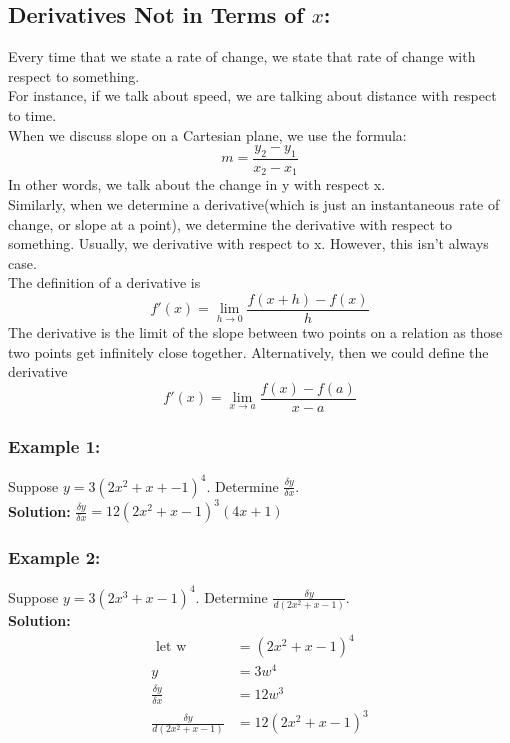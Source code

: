 \documentclass{article}
\begin{document}
\subsection{Derivatives Not in Terms of $x$:}
Every time that we state a rate of change, we state that rate of change with respect to something.\\
For instance, if we talk about speed, we are talking about distance with respect to time.\\
When we discuss slope on a Cartesian plane, we use the formula:
$$m=\frac{y_2-y_1}{x_2-x_1}$$
In other words, we talk about the change in y with respect x.\\
Similarly, when we determine a derivative(which is just an instantaneous rate of change, or slope at a point), we determine the derivative with respect to something. Usually, we derivative with respect to x. However, this isn't always case.\\

The definition of a derivative is 
$$f'(x)=\lim_{h \to 0}\frac{f(x+h)-f(x)}{h}$$
The derivative is the limit of the slope between two points on a relation as those two points get infinitely close together. Alternatively, then we could define the derivative $$f'(x)= \lim_{x \to a }\frac{f(x)-f(a)}{x-a}$$

\subsubsection*{Example 1:}
Suppose $y=3(2x^2+x+-1)^4$. Determine $\frac{\delta y}{\delta x}$.\\
\textbf{Solution:}
$\frac{\delta y}{\delta x}=12(2x^2+x-1)^3(4x+1)$
\subsubsection*{Example 2:}
Suppose $y=3(2x^3+x-1)^4$. Determine $\frac{\delta y}{d(2x^2+x-1)}$.\\
\textbf{Solution:}
\begin{align*}
    \text{ let w } &= (2x^2+x-1)^4\\
    y&=3w^4\\
    \frac{\delta y}{\delta x}&=12w^3\\
    \frac{\delta y}{d(2x^2+x-1)}&=12(2x^2+x-1)^3
\end{align*}
\end{document}
